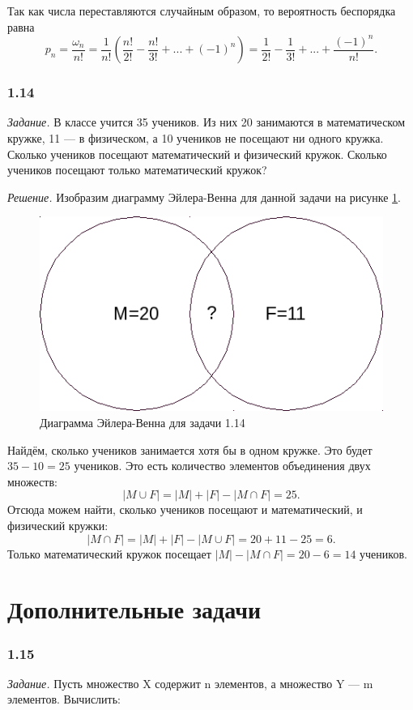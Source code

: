 \documentclass{book}
\begin{document}
Так как числа переставляются случайным образом, то вероятность беспорядка равна $$p_n=\frac{\omega_n}{n!}=\frac{1}{n!}\left(\frac{n!}{2!}-\frac{n!}{3!}+...+\left(-1\right)^n\right)=\frac{1}{2!}-\frac{1}{3!}+...+\frac{\left(-1\right)^n}{n!}.$$

\subsubsection*{1.14}

\textit{Задание.} В классе учится 35 учеников. Из них 20 занимаются в математическом кружке, 11 --- в физическом, а 10 учеников не посещают ни одного кружка. Сколько учеников посещают математический и физический кружок. Сколько учеников посещают только математический кружок?

\textit{Решение.} Изобразим диаграмму Эйлера-Венна для данной задачи на рисунке \ref{fig:114}. 

\begin{figure}[h!]
  \centering
  \includegraphics[width=.4\textwidth]{./pictures/1_14.png}
  \caption{Диаграмма Эйлера-Венна для задачи 1.14}
  \label{fig:114}
\end{figure}

Найдём, сколько учеников занимается хотя бы в одном кружке. Это будет $35-10=25$ учеников. Это есть количество элементов объединения двух множеств: $$|M\cup F|=|M|+|F|-|M\cap F|=25.$$ Отсюда можем найти, сколько учеников посещают и математический, и физический кружки: $$|M\cap F|=|M|+|F|-|M\cup F|=20+11-25=6.$$ Только математический кружок посещает $|M|-|M\cap F|=20-6=14$ учеников.

\section*{Дополнительные задачи}

\subsubsection*{1.15}

\textit{Задание.} Пусть множество X содержит n элементов, а множество Y --- m элементов. Вычислить:
\end{document}
